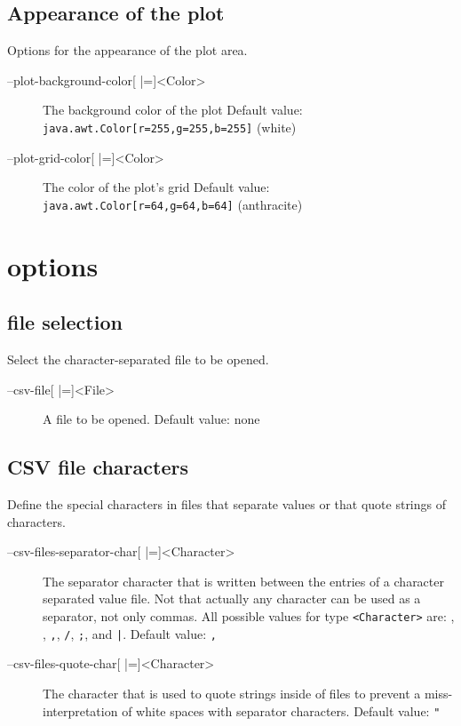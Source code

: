 \subsection{Appearance of the plot}
Options for the appearance of the plot area.
\begin{description}
\item[--plot-background-color{[} |={]}<Color>]
          The background color of the plot
          Default value:\\\texttt{java.awt.Color[r=255,g=255,b=255]} (white)
\item[--plot-grid-color{[} |={]}<Color>] The color of the plot's grid
          Default value:\\\texttt{java.awt.Color[r=64,g=64,b=64]} (\textcolor{anthracite}{anthracite})
\end{description}

\section{\CSV options}
\subsection{\CSV file selection}
Select the character-separated file to be opened.
\begin{description}
\item[--csv-file{[} |={]}<File>]
          A \CSV file to be opened.
          Default value: none
\end{description}

\subsection{CSV file characters}
Define the special characters in \CSV files that separate values or that quote strings of characters.
\begin{description}
\item[--csv-files-separator-char{[} |={]}<Character>]
          The separator character that is written between the entries of
          a character separated value file. Not that actually any \UTF
          character can be used as a separator, not only commas.
          All possible values for type \texttt{<Character>} are:
          \tab, \textvisiblespace, \texttt{,}, \texttt{/}, \texttt{;}, and \texttt{|}.
          Default value: \texttt{,}
\item[--csv-files-quote-char{[} |={]}<Character>]
          The character that is used to quote strings inside of \CSV
          files to prevent a miss-interpretation of white
          spaces with separator characters.
          Default value: \texttt{"}
\end{description}

